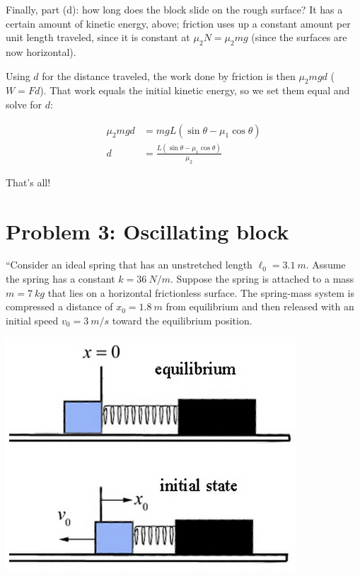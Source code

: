 \documentclass[8.01x]{subfiles}
\begin{document}
Finally, part (d): how long does the block slide on the rough surface? It has a certain amount of kinetic energy, above; friction uses up a constant amount per unit length traveled, since it is constant at $\mu_2 N = \mu_2 m g$ (since the surfaces are now horizontal).

Using $d$ for the distance traveled, the work done by friction is then $\mu_2 m g d$ ($W = F d$). That work equals the initial kinetic energy, so we set them equal and solve for $d$:

\begin{align}
\mu_2 m g d &= m g L (\sin \theta - \mu_1 \cos \theta)\\
d           &= \frac{L (\sin \theta - \mu_1 \cos \theta)}{\mu_2}
\end{align}

That's all!

\section{Problem 3: Oscillating block}

``Consider an ideal spring that has an unstretched length $\ell_0 = \SI{3.1}{m}$. Assume the spring has a constant $k = \SI{36}{N/m}$. Suppose the spring is attached to a mass $m = \SI{7}{kg}$ that lies on a horizontal frictionless surface. The spring-mass system is compressed a distance of $x_0 = \SI{1.8}{m}$ from equilibrium and then released with an initial speed $v_0 = \SI{3}{m/s}$ toward the equilibrium position.

\begin{center}
\includegraphics[scale=0.7]{Graphics/h4p3}
\end{center}
\end{document}
